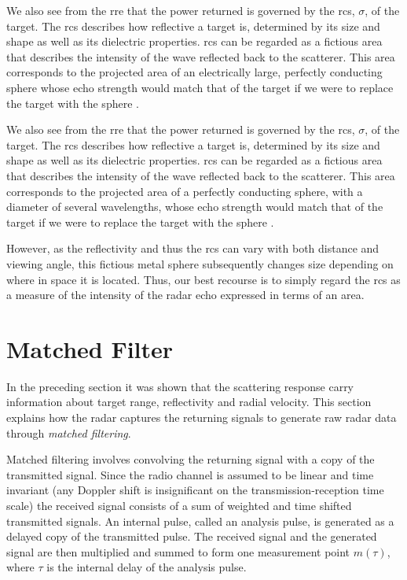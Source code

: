 We also see from the \gls{rre} that the power returned is governed by the \gls{rcs}, $\sigma$, of the target. The \gls{rcs} describes how reflective a target is, determined by its size and shape as well as its dielectric properties. \gls{rcs} can be regarded as a fictious area that describes the intensity of the wave reflected back to the scatterer. This area corresponds to the projected area of an electrically large, perfectly conducting sphere whose echo strength would match that of the target if we were to replace the target with the sphere \citep{knott_1993}. 

We also see from the \gls{rre} that the power returned is governed by the \gls{rcs}, $\sigma$, of the target. The \gls{rcs} describes how reflective a target is, determined by its size and shape as well as its dielectric properties. \gls{rcs} can be regarded as a fictious area that describes the intensity of the wave reflected back to the scatterer. This area corresponds to the projected area of a perfectly conducting sphere, with a diameter of several wavelengths, whose echo strength would match that of the target if we were to replace the target with the sphere \citep{knott_1993}. 

However, as the reflectivity and thus the \gls{rcs} can vary with both distance and viewing angle, this fictious metal sphere subsequently changes size depending on where in space it is located. Thus, our best recourse is to simply regard the \gls{rcs} as a measure of the intensity of the radar echo expressed in terms of an area. 

\section{Matched Filter}\label{sec:mf}

In the preceding section it was shown that the scattering response carry information about target range, reflectivity and radial velocity. This section explains how the radar captures the returning signals to generate raw radar data through \emph{matched filtering}.

Matched filtering involves convolving the returning signal with a copy of the transmitted signal. Since the radio channel is assumed to be linear and time invariant (any Doppler shift is insignificant on the transmission-reception time scale) the received signal consists of a sum of weighted and time shifted transmitted signals. An internal pulse, called an analysis pulse, is generated as a delayed copy of the transmitted pulse. The received signal and the generated signal are then multiplied and summed to form one measurement point $m(\tau)$, where $\tau$ is the internal delay of the analysis pulse. 

